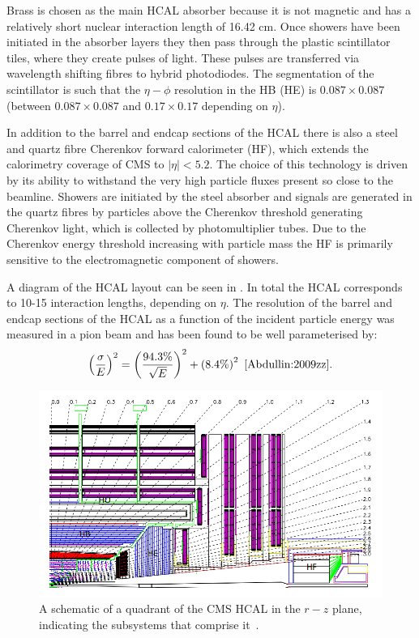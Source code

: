 Brass is chosen as the main \ac{HCAL} absorber because it is not magnetic and has a relatively short nuclear interaction length of 16.42 cm. Once showers have been initiated in the absorber layers they then pass through the plastic scintillator tiles, where they create pulses of light. These pulses are transferred via wavelength shifting fibres to hybrid photodiodes. The segmentation of the scintillator is such that the $\eta-\phi$ resolution in the \ac{HB} (\ac{HE}) is $0.087\times 0.087$ (between $0.087\times 0.087$ and $0.17\times 0.17$ depending on $\eta$).

In addition to the barrel and endcap sections of the \ac{HCAL} there is also a steel and quartz fibre Cherenkov forward calorimeter (\ac{HF}), which extends the calorimetry coverage of CMS to $|\eta|<5.2$. The choice of this technology is driven by its ability to withstand the very high particle fluxes present so close to the beamline. Showers are initiated by the steel absorber and signals are generated in the quartz fibres by particles above the Cherenkov threshold generating Cherenkov light, which is collected by photomultiplier tubes. Due to the Cherenkov energy threshold increasing with particle mass the \ac{HF} is primarily sensitive to the electromagnetic component of showers.

A diagram of the \ac{HCAL} layout can be seen in . In total the \ac{HCAL} corresponds to 10-15 interaction lengths, depending on $\eta$. The resolution of the barrel and endcap sections of the \ac{HCAL} as a function of the incident particle energy was measured in a pion beam and has been found to be well parameterised by:
\begin{equation} 
  \label{eq:hcalres}
  \left(\frac{\sigma}{E}\right)^{2}=\left(\frac{94.3\%}{\sqrt{E}}\right)^{2}+\left(8.4\%\right)^{2}~\cite{Abdullin:2009zz}.
\end{equation}

\begin{figure}
  \includegraphics[width=1.2\largefigwidth]{plots/detector/hcal_layout1.png}
  \caption[A schematic of a quadrant of the CMS HCAL in the $r-z$ plane, indicating the subsystems that comprise it.]{A schematic of a quadrant of the CMS HCAL in the $r-z$ plane, indicating the subsystems that comprise it~\cite{Chatrchyan:2008aa}.}
  \label{fig:hcalschematic}
\end{figure}

